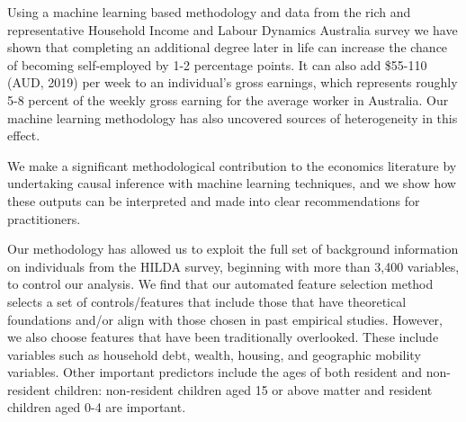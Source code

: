 \documentclass[12pt, a4paper]{article}
\begin{document}
Using a machine learning based methodology and data from the rich and
representative Household Income and Labour Dynamics Australia survey we have
shown that completing an additional degree later in life can increase the chance of becoming self-employed by 1-2 percentage points. It can also add \$55-110 (AUD,
2019) per week to an individual's gross earnings, which represents roughly 5-8
percent of the weekly gross earning for the average worker in Australia. Our
machine learning methodology has also uncovered sources of heterogeneity in
this effect.

We make a significant methodological contribution to the economics literature by undertaking causal inference with machine learning techniques, and we show how these outputs can be interpreted and made into clear recommendations for practitioners.  

Our methodology has allowed us to exploit the full set of background
information on individuals from the HILDA survey, beginning with more than
3,400 variables, to control our analysis. 
We find that our automated feature selection method selects a set of
controls/features that include those that have theoretical foundations and/or
align with those chosen in past empirical studies. However, we also choose
features that have been traditionally overlooked. These include variables such
as household debt, wealth, housing, and geographic mobility variables. Other
important predictors include the ages of both resident and non-resident
children: non-resident children aged 15 or above matter and resident children
aged 0-4 are important.

\end{document}
